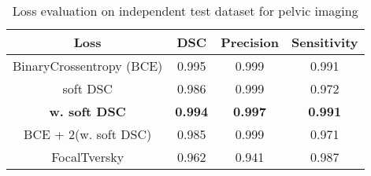 \begin{table}[H]
\footnotesize
\caption{Loss evaluation on independent test dataset for pelvic imaging}
\centering
\begin{tabular}{c c c c}
\hline\hline
Loss & DSC & Precision & Sensitivity \\ [0.5ex]
\hline
BinaryCrossentropy (BCE) & 0.995 & 0.999 & 0.991 \\
soft DSC & 0.986 & 0.999 & 0.972 \\
\textbf{w. soft DSC} & \textbf{0.994} & \textbf{0.997} & \textbf{0.991} \\
BCE + 2(w. soft DSC) & 0.985 & 0.999 & 0.971 \\
FocalTversky & 0.962 & 0.941 & 0.987 \\
\hline\hline
\end{tabular}
\label{table:loss_prostate}
\end{table}
